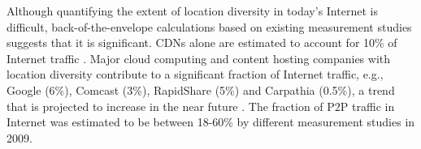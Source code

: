 






Although quantifying the extent of location diversity in today's Internet is difficult, back-of-the-envelope calculations based on existing measurement studies suggests that it is significant.  CDNs alone are estimated to account for 10\% of Internet traffic \cite{AtlasReport}. Major cloud computing and content hosting companies with location diversity contribute to a significant fraction of Internet traffic, e.g., Google (6\%), Comcast (3\%), RapidShare (5\%) and Carpathia (0.5\%), a trend that is projected to increase in the near future \cite{urlinternet,AtlasReport}. The fraction of P2P traffic in Internet was estimated to be between 18-60\% by different measurement studies in 2009.  %


